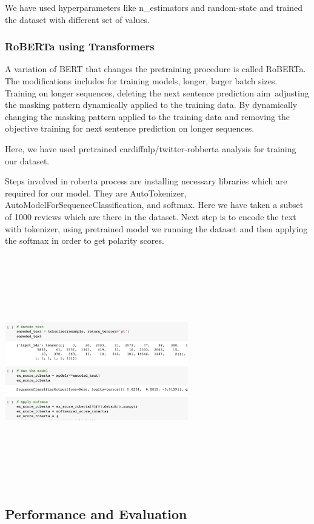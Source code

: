 We have used hyperparameters like n\_estimators and random-state and trained the dataset with different set of values.

\subsubsection{RoBERTa using Transformers}

A variation of BERT that changes the pretraining procedure is called RoBERTa. The modifications includes for training models, longer, larger batch sizes. Training on longer sequences, deleting the next sentence prediction aim\, adjusting the masking pattern dynamically applied to the training data.
By dynamically changing the masking pattern applied to the training data and removing the objective training for next sentence prediction on longer sequences.

Here, we have used pretrained cardiffnlp/twitter-robberta analysis for training our dataset.

Steps involved in roberta process are installing necessary libraries which are required for our model. They are AutoTokenizer, AutoModelForSequenceClassification, and softmax. Here we have taken a subset of 1000 reviews which are there in the dataset. Next step is to encode the text with tokenizer, using pretrained model we running the dataset and then applying the softmax in order to get polarity scores.

\includegraphics[width=8cm, height=10cm ]{encode.jpeg}

\subsection{Performance and Evaluation }

